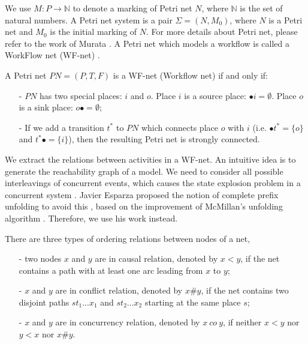 \documentclass{llncs}
\begin{document}
We use $M:P\rightarrow\mathbb{N}$ to denote a marking of Petri net $N$, where $\mathbb{N}$ is the set of natural numbers. A Petri net system is a pair $\Sigma=(N,M_{0})$, where $N$ is a Petri net and $M_{0}$ is the initial marking of $N$. For more details about Petri net, please refer to the work of Murata \cite{murata1989petri}. A Petri net which models a workflow is called a WorkFlow net (WF-net) \cite{van1998application}.

\begin{definition}[WF-net]\label{def:wfnet}
A Petri net $PN=(P,T,F)$ is a WF-net (Workflow net) if and only if:
	\begin{itemize}
		\item[-] $PN$ has two special places: $i$ and $o$. Place $i$ is a source place: $\bullet i=\emptyset$. Place $o$ is a sink place: $o\bullet =\emptyset$;
		\item[-] If we add a transition $t^{*}$ to $PN$ which connects place $o$ with $i$ (i.e. $\bullet t^{*}=\{o\}$ and $t^{*}\bullet=\{i\}$), then the resulting Petri net is strongly connected.
	\end{itemize}
\end{definition}

We extract the relations between activities in a WF-net. An intuitive idea is to generate the reachability graph of a model. We need to consider all possible interleavings of concurrent events, which causes the state explosion problem in a concurrent system \cite{mcmillan1995technique}. Javier Esparza proposed the notion of complete prefix unfolding to avoid this \cite{esparza1996improvement}, based on the improvement of McMillan's unfolding algorithm \cite{mcmillan1995technique}. Therefore, we use his work instead.

\begin{definition}\label{def:orderingRelations}
There are three types of ordering relations between nodes of a net,
	\begin{itemize}
		\item[-] two nodes $x$ and $y$ are in causal relation, denoted by $x<y$, if the net contains a path with at least one arc leading from $x$ to $y$;
		\item[-] $x$ and $y$ are in conflict relation, denoted by $x\#y$, if the net contains two disjoint paths $st_{1}...x_{1}$ and $st_{2}...x_{2}$ starting at the same place $s$;
		\item[-] $x$ and $y$ are in concurrency relation, denoted by $x~co~y$, if neither $x<y$ nor $y<x$ nor $x\#y$.
	\end{itemize}
\end{definition}
\end{document}
